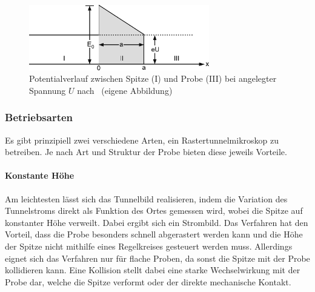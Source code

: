 \documentclass[a4paper,twoside,final]{article}
\begin{document}
\begin{figure}[htp]
    \centering
    \includegraphics[width=0.7\textwidth]{Bilder/Tunneleffekt_Spannung.pdf}
    \caption{Potentialverlauf zwischen Spitze (I) und Probe (III) bei angelegter Spannung $U$ nach~\cite{Hamann} (eigene Abbildung)}
    \label{fig:Tunneleffekt_Spannung}
\end{figure}

\subsubsection{Betriebsarten}
Es gibt prinzipiell zwei verschiedene Arten, ein Rastertunnelmikroskop zu betreiben. Je nach Art und Struktur der Probe bieten diese jeweils Vorteile.
\paragraph{Konstante Höhe} Am leichtesten lässt sich das Tunnelbild realisieren, indem die Variation des Tunnelstroms direkt als Funktion des Ortes gemessen wird, wobei die Spitze auf konstanter Höhe verweilt. Dabei ergibt sich ein Strombild. Das Verfahren hat den Vorteil, dass die Probe besonders schnell abgerastert werden kann und die Höhe der Spitze nicht mithilfe eines Regelkreises gesteuert werden muss. Allerdings eignet sich das Verfahren nur für flache Proben, da sonst die Spitze mit der Probe kollidieren kann. Eine Kollision stellt dabei eine starke Wechselwirkung mit der Probe dar, welche die Spitze verformt oder der direkte mechanische Kontakt.
\end{document}
